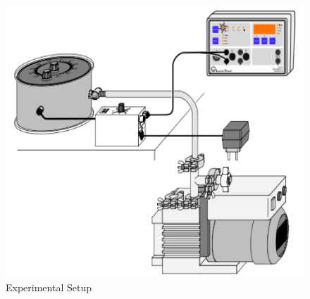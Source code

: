 		\begin{figure}[h]
			\centering
			\includegraphics[width=0.8\columnwidth]{images/theory3.png}
			\caption{Experimental Setup}
			\label{fig:3}
		\end{figure}
